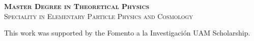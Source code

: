 \documentclass[
11pt, %
oneside, %
english, %
singlespacing, %
headsepline, %
consistentlayout, %
]{MastersDoctoralThesis} %
\begin{document}
\begin{titlepage}
\begin{center}
\vfill

{\scshape \textbf{Master Degree in Theoretical Physics}}\\
{\scshape Speciality in Elementary Particle Physics and Cosmology}\\%

 

\end{center}
\end{titlepage}



\begin{abstract}
\addchaptertocentry{\abstractname} %

\end{abstract}


\begin{acknowledgements}
\addchaptertocentry{\acknowledgementname} %
This work was supported by the Fomento a la Investigación UAM Scholarship.
\end{acknowledgements}


\tableofcontents %



\end{document}
